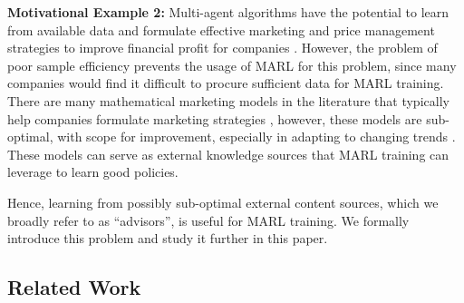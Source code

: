 \documentclass[jair, twoside,11pt,theapa]{article}
\begin{document}
\textbf{Motivational Example 2: } Multi-agent algorithms have the potential to learn from available data and formulate effective marketing and price management strategies to improve financial profit for companies \citep{ganesh2019reinforcement}. However, the problem of poor sample efficiency prevents the usage of MARL for this problem, since many companies would find it difficult to procure sufficient data for MARL training. There are many mathematical marketing models in the literature that typically help companies formulate marketing strategies \citep{Eryigit2017}, however, these models are sub-optimal, with scope for improvement, especially in adapting to changing trends \citep{storbacka2020changing}. These models can serve as external knowledge sources that MARL training can leverage to learn good policies. 

Hence,  learning from possibly sub-optimal external content sources, which we broadly refer to as ``advisors'', is useful for MARL training. We  formally introduce this problem and study it further in this paper.   




\subsection{Related Work}\label{sec:relatedwork}

\end{document}
